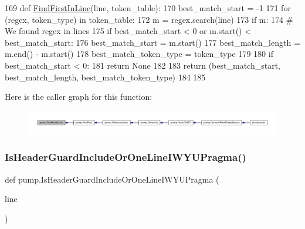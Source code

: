 \begin{DoxyCode}
169 \textcolor{keyword}{def }\hyperlink{namespacepump_af9f92ec64fe45399c7e051115a107ee7}{FindFirstInLine}(line, token\_table):
170   best\_match\_start = -1
171   \textcolor{keywordflow}{for} (regex, token\_type) \textcolor{keywordflow}{in} token\_table:
172     m = regex.search(line)
173     \textcolor{keywordflow}{if} m:
174       \textcolor{comment}{# We found regex in lines}
175       \textcolor{keywordflow}{if} best\_match\_start < 0 \textcolor{keywordflow}{or} m.start() < best\_match\_start:
176         best\_match\_start = m.start()
177         best\_match\_length = m.end() - m.start()
178         best\_match\_token\_type = token\_type
179 
180   \textcolor{keywordflow}{if} best\_match\_start < 0:
181     \textcolor{keywordflow}{return} \textcolor{keywordtype}{None}
182 
183   \textcolor{keywordflow}{return} (best\_match\_start, best\_match\_length, best\_match\_token\_type)
184 
185 
\end{DoxyCode}
Here is the caller graph for this function\+:
\nopagebreak
\begin{figure}[H]
\begin{center}
\leavevmode
\includegraphics[width=350pt]{namespacepump_af9f92ec64fe45399c7e051115a107ee7_icgraph}
\end{center}
\end{figure}
\mbox{\label{namespacepump_ac8a553b60dc83d100361a0e98d98451b}} 
\subsubsection{\texorpdfstring{Is\+Header\+Guard\+Include\+Or\+One\+Line\+I\+W\+Y\+U\+Pragma()}{IsHeaderGuardIncludeOrOneLineIWYUPragma()}}
{\footnotesize\ttfamily def pump.\+Is\+Header\+Guard\+Include\+Or\+One\+Line\+I\+W\+Y\+U\+Pragma (\begin{DoxyParamCaption}\item[{}]{line }\end{DoxyParamCaption})}



